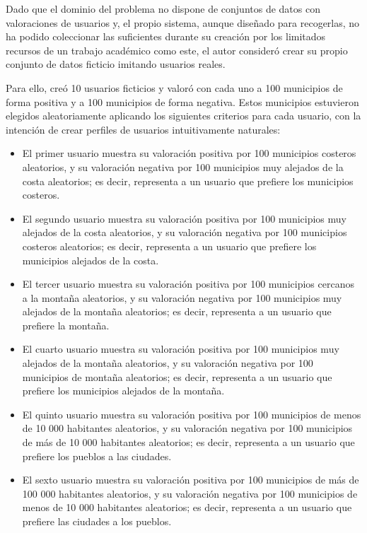 Dado que el dominio del problema no dispone de conjuntos de datos con valoraciones de usuarios y, el propio sistema, aunque diseñado para recogerlas, no ha podido coleccionar las suficientes durante su creación por los limitados recursos de un trabajo académico como este, el autor consideró crear su propio conjunto de datos ficticio imitando usuarios reales.

Para ello, creó 10 usuarios ficticios y valoró con cada uno a 100 municipios de forma positiva y a 100 municipios de forma negativa. Estos municipios estuvieron elegidos aleatoriamente aplicando los siguientes criterios para cada usuario, con la intención de crear perfiles de usuarios intuitivamente naturales:

\begin{itemize}
    \item El primer usuario muestra su valoración positiva por 100 municipios costeros aleatorios, y su valoración negativa por 100 municipios muy alejados de la costa aleatorios; es decir, representa a un usuario que prefiere los municipios costeros.

    \item El segundo usuario muestra su valoración positiva por 100 municipios muy alejados de la costa aleatorios, y su valoración negativa por 100 municipios costeros aleatorios; es decir, representa a un usuario que prefiere los municipios alejados de la costa.

    \item El tercer usuario muestra su valoración positiva por 100 municipios cercanos a la montaña aleatorios, y su valoración negativa por 100 municipios muy alejados de la montaña aleatorios; es decir, representa a un usuario que prefiere la montaña.
    
    \item El cuarto usuario muestra su valoración positiva por 100 municipios muy alejados de la montaña aleatorios, y su valoración negativa por 100 municipios de montaña aleatorios; es decir, representa a un usuario que prefiere los municipios alejados de la montaña.

    \item El quinto usuario muestra su valoración positiva por 100 municipios de menos de 10 000 habitantes aleatorios, y su valoración negativa por 100 municipios de más de 10 000 habitantes aleatorios; es decir, representa a un usuario que prefiere los pueblos a las ciudades.

    \item El sexto usuario muestra su valoración positiva por 100 municipios de más de 100 000 habitantes aleatorios, y su valoración negativa por 100 municipios de menos de 10 000 habitantes aleatorios; es decir, representa a un usuario que prefiere las ciudades a los pueblos.


\end{itemize}

